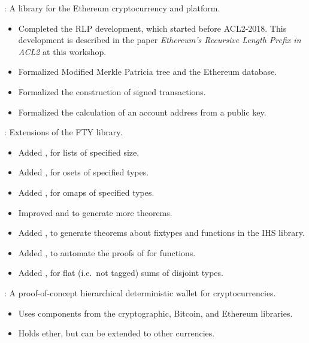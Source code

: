 \begin{frame}

\implibtitle

:
A library for the Ethereum cryptocurrency and platform.
\begin{itemize}
\item
Completed the RLP development, which started before ACL2-2018.
This development is described in the paper
\textit{Ethereum's Recursive Length Prefix in ACL2} at this workshop.
\item
Formalized Modified Merkle Patricia tree and the Ethereum database.
\item
Formalized the construction of signed transactions.
\item
Formalized the calculation of an account address from a public key.
\end{itemize}

\end{frame}


\begin{frame}

\implibtitle

:
Extensions of the FTY library.
\begin{itemize}
\item
Added , for lists of specified size.
\item
Added , for osets of specified types.
\item
Added , for omaps of specified types.
\item
Improved  and  to generate more theorems.
\item
Added ,
to generate theorems about  fixtypes
and functions in the IHS library.
\item
Added ,
to automate the proofs of  for  functions.
\item
Added ,
for flat (i.e.\ not tagged) sums of disjoint types.
\end{itemize}

\end{frame}


\begin{frame}

\implibtitle

:
A proof-of-concept hierarchical deterministic wallet for cryptocurrencies.
\begin{itemize}
\item
Uses components from the cryptographic, Bitcoin, and Ethereum libraries.
\item
Holds ether, but can be extended to other currencies.
\end{itemize}

\end{frame}

